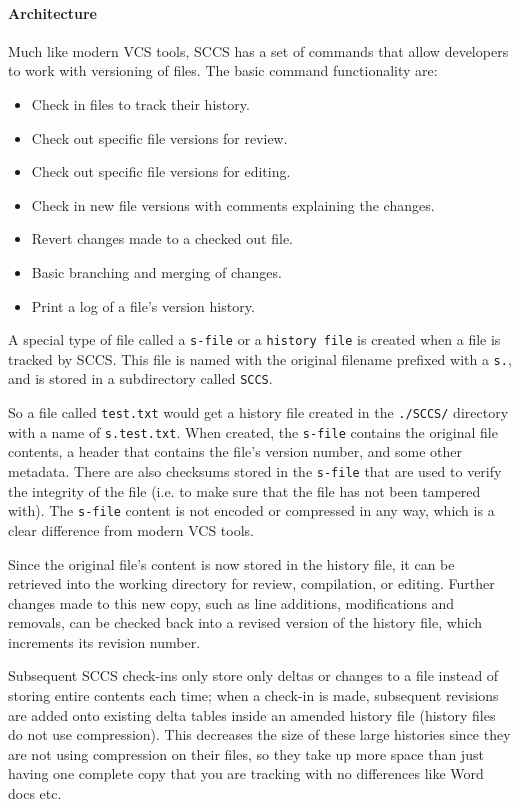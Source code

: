\paragraph{Architecture}
Much like modern VCS tools, SCCS has a set of commands that allow developers to work with versioning of files. The basic command functionality are:
\begin{itemize}
    \item Check in files to track their history.
    \item Check out specific file versions for review.
    \item Check out specific file versions for editing.
    \item Check in new file versions with comments explaining the changes.
    \item Revert changes made to a checked out file.
    \item Basic branching and merging of changes.
    \item Print a log of a file's version history.
\end{itemize}
A special type of file called a \lstinline{s-file} or a \lstinline{history file} is created when a file is tracked by SCCS. This file is named with the original filename prefixed with a \lstinline{s.}, and is stored in a subdirectory called \lstinline{SCCS}.

So a file called \lstinline{test.txt} would get a history file created in the \lstinline{./SCCS/} directory with a name of \lstinline{s.test.txt}. When created, the \lstinline{s-file} contains the original file contents, a header that contains the file's version number, and some other metadata. There are also checksums stored in the \lstinline{s-file} that are used to verify the integrity of the file (i.e. to make sure that the file has not been tampered with). The \lstinline{s-file} content is not encoded or compressed in any way, which is a clear difference from modern VCS tools.

Since the original file's content is now stored in the history file, it can be retrieved into the working directory for review, compilation, or editing. Further changes made to this new copy, such as line additions, modifications and removals, can be checked back into a revised version of the history file, which increments its revision number.

Subsequent SCCS check-ins only store only deltas or changes to a file instead of storing entire contents each time; when a check-in is made, subsequent revisions are added onto existing delta tables inside an amended history file (history files do not use compression). This decreases the size of these large histories since they are not using compression on their files, so they take up more space than just having one complete copy that you are tracking with no differences like Word docs etc.

